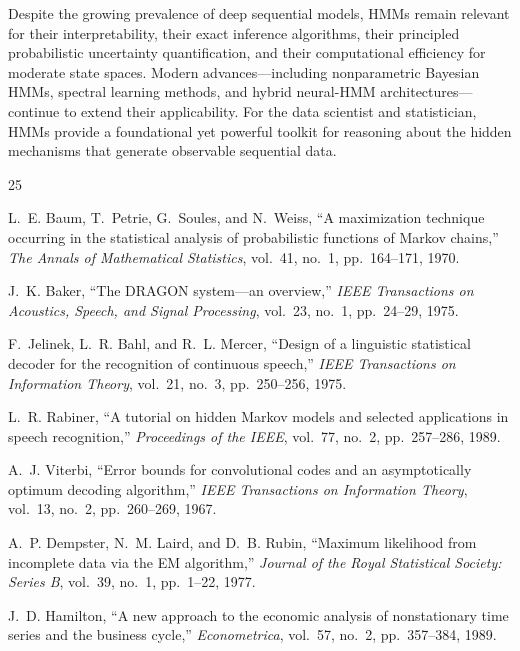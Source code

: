 \documentclass[conference]{IEEEtran}
\begin{document}
Despite the growing prevalence of deep sequential models, HMMs remain relevant for their interpretability, their exact inference algorithms, their principled probabilistic uncertainty quantification, and their computational efficiency for moderate state spaces. Modern advances---including nonparametric Bayesian HMMs, spectral learning methods, and hybrid neural-HMM architectures---continue to extend their applicability. For the data scientist and statistician, HMMs provide a foundational yet powerful toolkit for reasoning about the hidden mechanisms that generate observable sequential data.



\begin{thebibliography}{25}

L.~E. Baum, T.~Petrie, G.~Soules, and N.~Weiss,
``A maximization technique occurring in the statistical analysis of probabilistic functions of Markov chains,''
\emph{The Annals of Mathematical Statistics}, vol.~41, no.~1, pp.~164--171, 1970.

J.~K. Baker,
``The DRAGON system---an overview,''
\emph{IEEE Transactions on Acoustics, Speech, and Signal Processing}, vol.~23, no.~1, pp.~24--29, 1975.

F.~Jelinek, L.~R. Bahl, and R.~L. Mercer,
``Design of a linguistic statistical decoder for the recognition of continuous speech,''
\emph{IEEE Transactions on Information Theory}, vol.~21, no.~3, pp.~250--256, 1975.

L.~R. Rabiner,
``A tutorial on hidden Markov models and selected applications in speech recognition,''
\emph{Proceedings of the IEEE}, vol.~77, no.~2, pp.~257--286, 1989.

A.~J. Viterbi,
``Error bounds for convolutional codes and an asymptotically optimum decoding algorithm,''
\emph{IEEE Transactions on Information Theory}, vol.~13, no.~2, pp.~260--269, 1967.

A.~P. Dempster, N.~M. Laird, and D.~B. Rubin,
``Maximum likelihood from incomplete data via the EM algorithm,''
\emph{Journal of the Royal Statistical Society: Series B}, vol.~39, no.~1, pp.~1--22, 1977.

J.~D. Hamilton,
``A new approach to the economic analysis of nonstationary time series and the business cycle,''
\emph{Econometrica}, vol.~57, no.~2, pp.~357--384, 1989.


\end{thebibliography}
\end{document}
